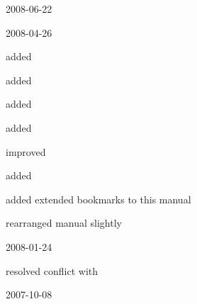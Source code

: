 \begin{changelog}
\begin{release}{1.6}{2008-06-22}
\end{release}

\begin{release}{1.5}{2008-04-26}

\item added 
\item added 
\item added 
\item added 
\item improved 
\item added 
\item added extended \pdf bookmarks to this manual
\item rearranged manual slightly 

\end{release}

\begin{release}{1.4}{2008-01-24}

\item resolved conflict with 

\end{release}

\begin{release}{1.3}{2007-10-08}


\end{release}
\end{changelog}
